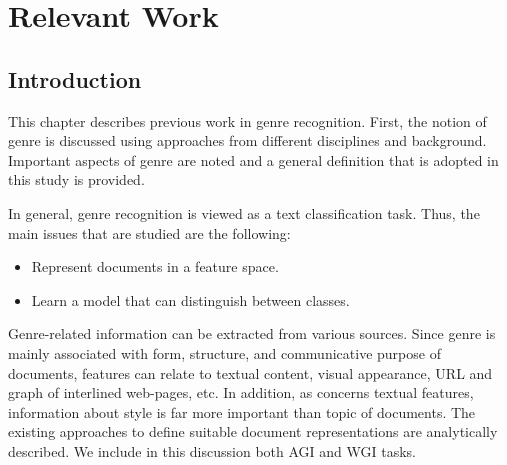 
\chapter{Relevant Work}

\label{chap:relevant_work}


\newcommand{\keyword}[1]{\textbf{#1}}
\newcommand{\tabhead}[1]{\textbf{#1}}
\newcommand{\code}[1]{\texttt{#1}}
\newcommand{\file}[1]{\texttt{\bfseries#1}}
\newcommand{\option}[1]{\texttt{\itshape#1}}


\section{Introduction}\label{chap:relevant_work:sec:intro}

This chapter describes previous work in genre recognition. First, the notion of genre is discussed using approaches from different disciplines and background. Important aspects of genre are noted and a general definition that is adopted in this study is provided.

In general, genre recognition is viewed as a text classification task. Thus, the main issues that are studied are the following:

\begin{itemize}
    \item Represent documents in a feature space.
    \item Learn a model that can distinguish between classes.
\end{itemize}

Genre-related information can be extracted from various sources. Since genre is mainly associated with form, structure, and communicative purpose of documents, features can relate to textual content, visual appearance, URL and graph of interlined web-pages, etc. In addition, as concerns textual features, information about style is far more important than topic of documents. The existing approaches to define suitable document representations are analytically described. We include in this discussion both AGI and WGI tasks.

